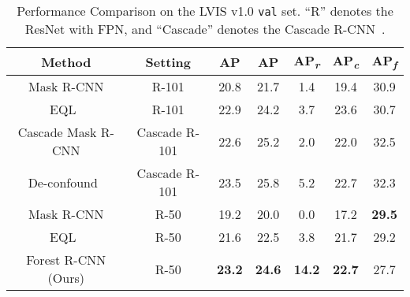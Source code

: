 \documentclass[sigconf]{acmart}
\begin{document}
\begin{table}
	\centering
	\caption{Performance Comparison on the LVIS v1.0 \texttt{val} set. ``R'' denotes the ResNet with FPN, and ``Cascade'' denotes the Cascade R-CNN~\cite{cai2018cascade}.}
	\vspace{-3mm}
	\label{tab:v1}
	\setlength{\tabcolsep}{2pt}
	\begin{tabular}{c|c|cc|ccc}
		Method&Setting&AP&AP& AP\textsubscript{\textit{r}} & AP\textsubscript{\textit{c}} & AP\textsubscript{\textit{f}}\\
		\toprule[1.3pt]
		Mask R-CNN&R-101&20.8&21.7&1.4&19.4 &30.9\\
		EQL~\cite{equalization_loss}&R-101&22.9&24.2&3.7&23.6 &30.7\\
		Cascade Mask R-CNN&Cascade R-101&22.6&25.2&2.0&22.0 &32.5\\
		De-confound~\cite{tang2020long}&Cascade R-101&23.5&25.8&5.2&22.7 &32.3\\
		\hline
		\hline
		Mask R-CNN&R-50&19.2&20.0&0.0&17.2 &\bf 29.5\\
		EQL~\cite{equalization_loss}&R-50&21.6&22.5&3.8&21.7 &29.2\\
		Forest R-CNN (Ours)&R-50&\bf23.2&\bf24.6&\bf 14.2&\bf22.7 &27.7
	\end{tabular}
\vspace{-3mm}
\end{table}
\end{document}
